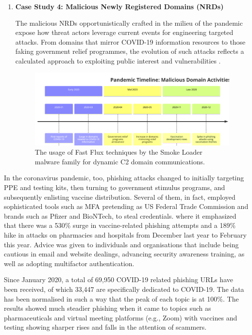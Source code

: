 \begin{enumerate}
\item\textbf{Case Study 4:  Malicious Newly Registered Domains (NRDs)}

The malicious NRDs opportunistically crafted in the milieu of the pandemic expose how threat actors leverage current events for engineering targeted attacks. \cite{paloaltonetworks2021dnsattacks} From domains that mirror COVID-19 information resources to those faking government relief programmes, the evolution of such attacks reflects a calculated approach to exploiting public interest and vulnerabilities  \cite{unit42_covid19_phishing_2021} .

\captionsetup{font= footnotesize}
\begin{figure}[H]
    \centering
    \includegraphics[width=0.8\linewidth]{background/PandemicTime.png}
    \caption{The usage of Fast Flux techniques by the Smoke Loader malware family for dynamic C2 domain communications.}
    \label{fig:figThirteen}
\end{figure}

\end{enumerate}

In the coronavirus pandemic, too, phishing attacks changed to initially targeting PPE and testing kits, then turning to government stimulus programs, and subsequently enlisting vaccine distribution. Several of them, in fact, employed sophisticated tools such as MFA pretending as US Federal Trade Commission and brands such as Pfizer and BioNTech, to steal credentials. where it emphasized that there was a 530\% surge in vaccine-related phishing attempts and a 189\% hike in attacks on pharmacies and hospitals from December last year to February this year. Advice was given to individuals and organisations that include being cautious in email and website dealings, advancing security awareness training, as well as adopting multifactor authentication.

Since January 2020, a total of 69,950 COVID-19 related phishing URLs have been received, of which 33,447 are specifically dedicated to COVID-19. The data has been normalised in such a way that the peak of each topic is at 100\%. The results showed much steadier phishing when it came to topics such as pharmaceuticals and virtual meeting platforms (e.g., Zoom) with vaccines and testing showing sharper rises and falls in the attention of scammers.

